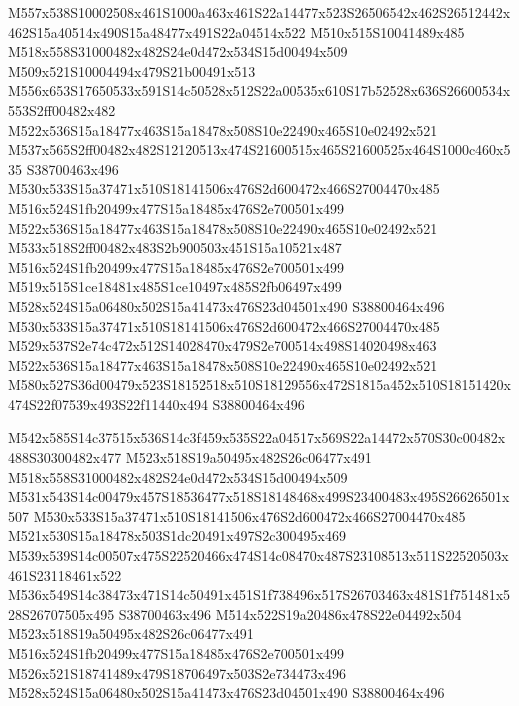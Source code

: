 \documentclass{article}
\begin{document}
\begin{multicols}{2}
M557x538S10002508x461S1000a463x461S22a14477x523S26506542x462S26512442x462S15a40514x490S15a48477x491S22a04514x522 M510x515S10041489x485 M518x558S31000482x482S24e0d472x534S15d00494x509 M509x521S10004494x479S21b00491x513 M556x653S17650533x591S14c50528x512S22a00535x610S17b52528x636S26600534x553S2ff00482x482 M522x536S15a18477x463S15a18478x508S10e22490x465S10e02492x521 M537x565S2ff00482x482S12120513x474S21600515x465S21600525x464S1000c460x535 S38700463x496 M530x533S15a37471x510S18141506x476S2d600472x466S27004470x485 M516x524S1fb20499x477S15a18485x476S2e700501x499 M522x536S15a18477x463S15a18478x508S10e22490x465S10e02492x521 M533x518S2ff00482x483S2b900503x451S15a10521x487 M516x524S1fb20499x477S15a18485x476S2e700501x499 M519x515S1ce18481x485S1ce10497x485S2fb06497x499 M528x524S15a06480x502S15a41473x476S23d04501x490 S38800464x496 M530x533S15a37471x510S18141506x476S2d600472x466S27004470x485 M529x537S2e74c472x512S14028470x479S2e700514x498S14020498x463 M522x536S15a18477x463S15a18478x508S10e22490x465S10e02492x521 M580x527S36d00479x523S18152518x510S18129556x472S1815a452x510S18151420x474S22f07539x493S22f11440x494 S38800464x496

M542x585S14c37515x536S14c3f459x535S22a04517x569S22a14472x570S30c00482x488S30300482x477 M523x518S19a50495x482S26c06477x491 M518x558S31000482x482S24e0d472x534S15d00494x509 M531x543S14c00479x457S18536477x518S18148468x499S23400483x495S26626501x507 M530x533S15a37471x510S18141506x476S2d600472x466S27004470x485 M521x530S15a18478x503S1dc20491x497S2c300495x469 M539x539S14c00507x475S22520466x474S14c08470x487S23108513x511S22520503x461S23118461x522 M536x549S14c38473x471S14c50491x451S1f738496x517S26703463x481S1f751481x528S26707505x495 S38700463x496 M514x522S19a20486x478S22e04492x504 M523x518S19a50495x482S26c06477x491 M516x524S1fb20499x477S15a18485x476S2e700501x499 M526x521S18741489x479S18706497x503S2e734473x496 M528x524S15a06480x502S15a41473x476S23d04501x490 S38800464x496


\end{multicols}
\end{document}
